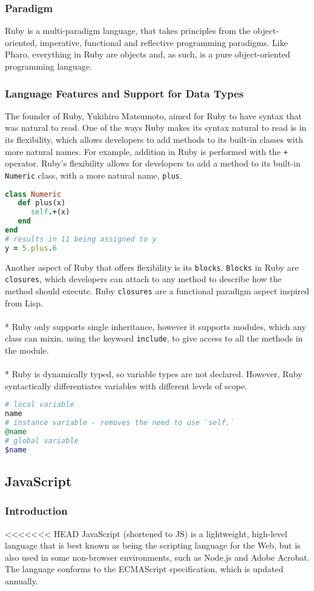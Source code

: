\subsubsection*{Paradigm}
Ruby is a multi-paradigm language, that takes principles from the object-oriented, imperative, functional and reflective programming paradigms. Like Pharo, everything in Ruby are objects and, as such, is a pure object-oriented programming language.
\subsubsection*{Language Features and Support for Data Types}
The founder of Ruby, Yukihiro Matsumoto, aimed for Ruby to have syntax that was natural to read. One of the ways Ruby makes its syntax natural to read is in its flexibility, which allows developers to add methods to its built-in classes with more natural names. For example, addition in Ruby is performed with the \texttt{+} operator. Ruby's flexibility allows for developers to add a method to its built-in \texttt{Numeric} class, with a more natural name, \texttt{plus}.
\begin{lstlisting}[language=Ruby]
class Numeric
   def plus(x)
      self.+(x)
   end
end
# results in 11 being assigned to y
y = 5.plus.6
\end{lstlisting}
Another aspect of Ruby that offers flexibility is its \texttt{blocks}. \texttt{Blocks} in Ruby are \texttt{closures}, which developers can attach to any method to describe how the method should execute. Ruby \texttt{closures} are a functional paradigm aspect inspired from Lisp.\\\\* 
Ruby only supports single inheritance, however it supports modules, which any class can mixin, using the keyword \texttt{include}, to give access to all the methods in the module.\\\\*
Ruby is dynamically typed, so variable types are not declared. However, Ruby syntactically differentiates variables with different levels of scope.
\begin{lstlisting}[language=Ruby]
# local variable
name
# instance variable - removes the need to use `self.`
@name
# global variable
$name
\end{lstlisting}
\subsection*{JavaScript}
\subsubsection*{Introduction}
<<<<<<< HEAD
JavaScript (shortened to JS) is a lightweight, high-level language that is best known as being the scripting language for the Web, but is also used in some non-browser environments, such as Node.js and Adobe Acrobat. The language conforms to the ECMAScript specification, which is updated annually.
